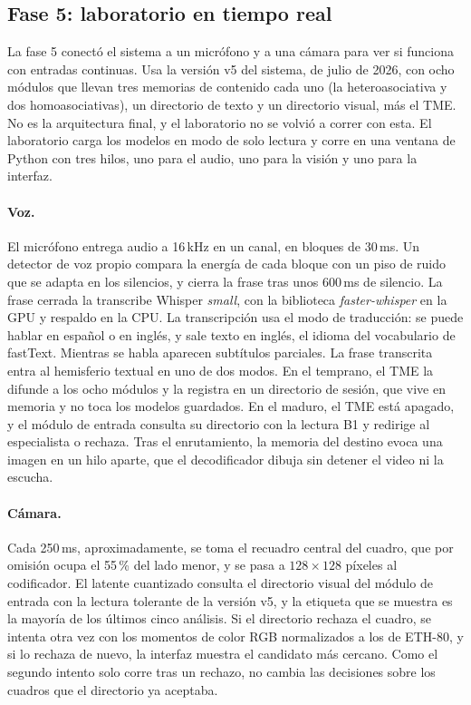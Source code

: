 \subsection{Fase 5: laboratorio en tiempo real}
\label{fase5:laboratorio}

La fase 5 conectó el sistema a un micrófono y a una cámara para ver si funciona con
entradas continuas.
Usa la versión v5 del sistema, de julio de 2026, con ocho módulos que llevan tres
memorias de contenido cada uno (la heteroasociativa y dos homoasociativas), un
directorio de texto y un directorio visual, más el TME.
No es la arquitectura final, y el laboratorio no se volvió a correr con esta.
El laboratorio carga los modelos en modo de solo lectura y corre en una ventana de
Python con tres hilos, uno para el audio, uno para la visión y uno para la interfaz.

\paragraph{Voz.}
El micrófono entrega audio a 16\,kHz en un canal, en bloques de 30\,ms.
Un detector de voz propio compara la energía de cada bloque con un piso de ruido que se
adapta en los silencios, y cierra la frase tras unos 600\,ms de silencio.
La frase cerrada la transcribe Whisper \textit{small}, con la biblioteca
\textit{faster-whisper} en la GPU y respaldo en la CPU.
La transcripción usa el modo de traducción: se puede hablar en español o en inglés, y
sale texto en inglés, el idioma del vocabulario de fastText.
Mientras se habla aparecen subtítulos parciales.
La frase transcrita entra al hemisferio textual en uno de dos modos.
En el temprano, el TME la difunde a los ocho módulos y la registra en un directorio de
sesión, que vive en memoria y no toca los modelos guardados.
En el maduro, el TME está apagado, y el módulo de entrada consulta su directorio con la
lectura B1 y redirige al especialista o rechaza.
Tras el enrutamiento, la memoria del destino evoca una imagen en un hilo aparte, que el
decodificador dibuja sin detener el video ni la escucha.

\paragraph{Cámara.}
Cada 250\,ms, aproximadamente, se toma el recuadro central del cuadro, que por omisión
ocupa el 55\,\% del lado menor, y se pasa a $128 \times 128$ píxeles al codificador.
El latente cuantizado consulta el directorio visual del módulo de entrada con la lectura
tolerante de la versión v5, y la etiqueta que se muestra es la mayoría de los últimos
cinco análisis.
Si el directorio rechaza el cuadro, se intenta otra vez con los momentos de color RGB
normalizados a los de ETH-80, y si lo rechaza de nuevo, la interfaz muestra el candidato
más cercano.
Como el segundo intento solo corre tras un rechazo, no cambia las decisiones sobre los
cuadros que el directorio ya aceptaba.

